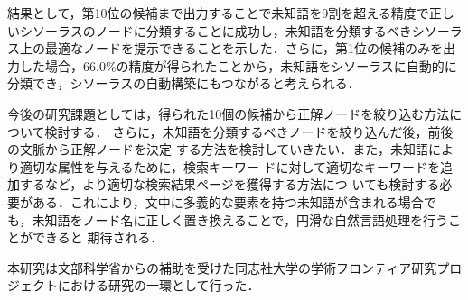\documentclass[japanese]{jnlp_1.4}
\begin{document}
結果として，第10位の候補まで出力することで未知語を9割を超える精度で正しいシソーラスのノードに分類することに成功し，未知語を分類するべきシソーラス上の最適なノードを提示できることを示した．さらに，第1位の候補のみを出力した場合，66.0\%の精度が得られたことから，未知語をシソーラスに自動的に分類でき，シソーラスの自動構築にもつながると考えられる．

今後の研究課題としては，得られた10個の候補から正解ノードを絞り込む方法について検討する．
さらに，未知語を分類するべきノードを絞り込んだ後，前後の文脈から正解ノードを決定
する方法を検討していきたい．また，未知語により適切な属性を与えるために，検索キーワー
ドに対して適切なキーワードを追加するなど，より適切な検索結果ページを獲得する方法につ
いても検討する必要がある．これにより，文中に多義的な要素を持つ未知語が含まれる場合で
も，未知語をノード名に正しく置き換えることで，円滑な自然言語処理を行うことができると
期待される．



\acknowledgment

本研究は文部科学省からの補助を受けた同志社大学の学術フロンティア研究プロジェクトにおける研究の一環として行った．
\end{document}
